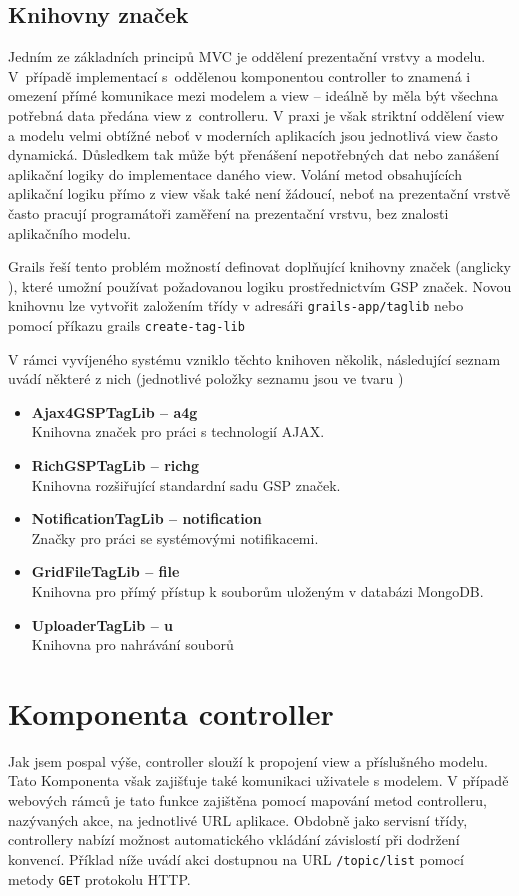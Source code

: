 \subsection{Knihovny značek}
Jedním ze základních principů MVC je oddělení prezentační vrstvy a modelu. V~případě implementací s~oddělenou komponentou controller to znamená i omezení přímé komunikace mezi modelem a view  -- ideálně by měla být všechna potřebná data předána view z~controlleru. V praxi je však striktní oddělení view a modelu velmi obtížné neboť v moderních aplikacích jsou jednotlivá view často dynamická. Důsledkem tak může být přenášení nepotřebných dat nebo zanášení aplikační logiky do implementace daného view. Volání metod obsahujících aplikační logiku přímo z view však také není žádoucí, neboť na prezentační vrstvě často pracují programátoři zaměření na prezentační vrstvu, bez znalosti aplikačního modelu.


Grails řeší tento problém možností definovat doplňující knihovny značek (anglicky ), které umožní používat požadovanou logiku prostřednictvím GSP značek. Novou knihovnu lze vytvořit založením třídy v adresáři \texttt{grails-app/taglib} nebo pomocí příkazu grails \texttt{create-tag-lib}

V rámci vyvíjeného systému vzniklo těchto knihoven několik, následující seznam uvádí některé z nich (jednotlivé položky seznamu jsou ve tvaru )
\begin{itemize}
\item \textbf{Ajax4GSPTagLib -- a4g} \\
Knihovna značek pro práci s technologií AJAX.
\item \textbf{RichGSPTagLib -- richg}\\
Knihovna rozšiřující standardní sadu GSP značek.
\item \textbf{NotificationTagLib -- notification}\\
Značky pro práci se systémovými notifikacemi.
\item \textbf{GridFileTagLib -- file}\\
Knihovna pro přímý přístup k souborům uloženým v databázi MongoDB.
\item \textbf{UploaderTagLib -- u}\\
Knihovna pro nahrávání souborů
\end{itemize}

\section{Komponenta controller }
Jak jsem pospal výše, controller slouží k propojení view a příslušného modelu. Tato Komponenta však zajišťuje také komunikaci uživatele s modelem. V případě webových rámců je tato funkce zajištěna pomocí mapování metod controlleru, nazývaných akce, na jednotlivé URL aplikace. Obdobně jako servisní třídy, controllery nabízí možnost automatického vkládání závislostí při dodržení konvencí. Příklad níže uvádí akci dostupnou na URL \texttt{/topic/list} pomocí metody \texttt{GET} protokolu HTTP.

